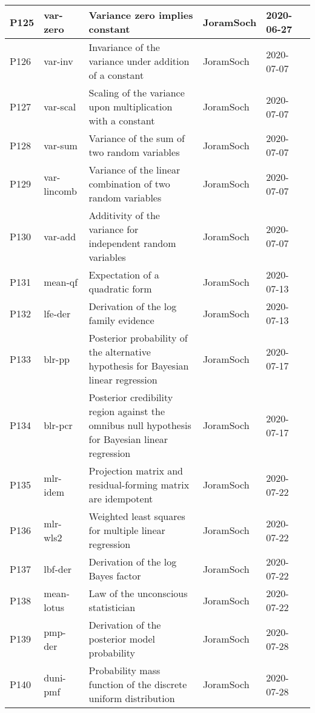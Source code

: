 \documentclass[a4paper,12pt,twoside]{book}
\begin{document}
\begin{longtable}{|p{1cm}|p{2cm}|p{6.5cm}|p{3cm}|p{2cm}|c|}
P125 & var-zero & Variance zero implies constant & JoramSoch & 2020-06-27 & \pageref{sec:var-zero} \\ \hline
P126 & var-inv & Invariance of the variance under addition of a constant & JoramSoch & 2020-07-07 & \pageref{sec:var-inv} \\ \hline
P127 & var-scal & Scaling of the variance upon multiplication with a constant & JoramSoch & 2020-07-07 & \pageref{sec:var-scal} \\ \hline
P128 & var-sum & Variance of the sum of two random variables & JoramSoch & 2020-07-07 & \pageref{sec:var-sum} \\ \hline
P129 & var-lincomb & Variance of the linear combination of two random variables & JoramSoch & 2020-07-07 & \pageref{sec:var-lincomb} \\ \hline
P130 & var-add & Additivity of the variance for independent random variables & JoramSoch & 2020-07-07 & \pageref{sec:var-add} \\ \hline
P131 & mean-qf & Expectation of a quadratic form & JoramSoch & 2020-07-13 & \pageref{sec:mean-qf} \\ \hline
P132 & lfe-der & Derivation of the log family evidence & JoramSoch & 2020-07-13 & \pageref{sec:lfe-der} \\ \hline
P133 & blr-pp & Posterior probability of the alternative hypothesis for Bayesian linear regression & JoramSoch & 2020-07-17 & \pageref{sec:blr-pp} \\ \hline
P134 & blr-pcr & Posterior credibility region against the omnibus null hypothesis for Bayesian linear regression & JoramSoch & 2020-07-17 & \pageref{sec:blr-pcr} \\ \hline
P135 & mlr-idem & Projection matrix and residual-forming matrix are idempotent & JoramSoch & 2020-07-22 & \pageref{sec:mlr-idem} \\ \hline
P136 & mlr-wls2 & Weighted least squares for multiple linear regression & JoramSoch & 2020-07-22 & \pageref{sec:mlr-wls2} \\ \hline
P137 & lbf-der & Derivation of the log Bayes factor & JoramSoch & 2020-07-22 & \pageref{sec:lbf-der} \\ \hline
P138 & mean-lotus & Law of the unconscious statistician & JoramSoch & 2020-07-22 & \pageref{sec:mean-lotus} \\ \hline
P139 & pmp-der & Derivation of the posterior model probability & JoramSoch & 2020-07-28 & \pageref{sec:pmp-der} \\ \hline
P140 & duni-pmf & Probability mass function of the discrete uniform distribution & JoramSoch & 2020-07-28 & \pageref{sec:duni-pmf} \\ \hline

\end{longtable}
\end{document}
